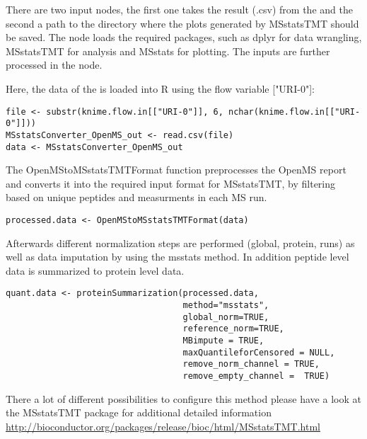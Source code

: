 \noindent There are two input nodes, the first one takes the result (.csv) from the  and the second a path to the directory where the plots generated by MSstatsTMT should be saved. The  node loads the required packages, such as dplyr for data wrangling, MSstatsTMT for analysis and MSstats for plotting. The inputs are further processed in the  node.  

\noindent Here, the data of the  is loaded into R using the flow variable ["URI-0"]:
\begin{code}
\begin{verbatim}
file <- substr(knime.flow.in[["URI-0"]], 6, nchar(knime.flow.in[["URI-0"]]))
MSstatsConverter_OpenMS_out <- read.csv(file)
data <- MSstatsConverter_OpenMS_out
\end{verbatim}
\end{code}

\noindent The OpenMStoMSstatsTMTFormat function preprocesses the OpenMS report and converts it into the required input format for MSstatsTMT, by filtering based on unique peptides and measurments in each MS run.

\begin{code}
\begin{verbatim}
processed.data <- OpenMStoMSstatsTMTFormat(data)
\end{verbatim}
\end{code}

\noindent Afterwards different normalization steps are performed (global, protein, runs) as well as data imputation by using the msstats method. In addition peptide level data is summarized to protein level data. 

\begin{code}
\begin{verbatim}
quant.data <- proteinSummarization(processed.data,
                                   method="msstats",
                                   global_norm=TRUE,
                                   reference_norm=TRUE,
                                   MBimpute = TRUE,
                                   maxQuantileforCensored = NULL,
                                   remove_norm_channel = TRUE,
                                   remove_empty_channel =  TRUE)
\end{verbatim}
\end{code}
        
\noindent There a lot of different possibilities to configure this method please have a look at the MSstatsTMT package for additional detailed information \url{http://bioconductor.org/packages/release/bioc/html/MSstatsTMT.html}                       


